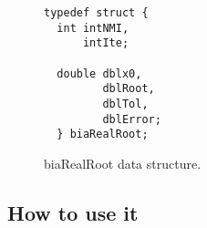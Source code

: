 \begin{figure}[!h]
\begin{verbatim}
typedef struct {
  int intNMI,
      intIte;

  double dblx0,
         dblRoot,
         dblTol,
         dblError;
  } biaRealRoot;
\end{verbatim}
\caption{biaRealRoot data structure.} \label{fig:biaRealRoot}
\end{figure}

\FloatBarrier

\subsection{How to use it}
